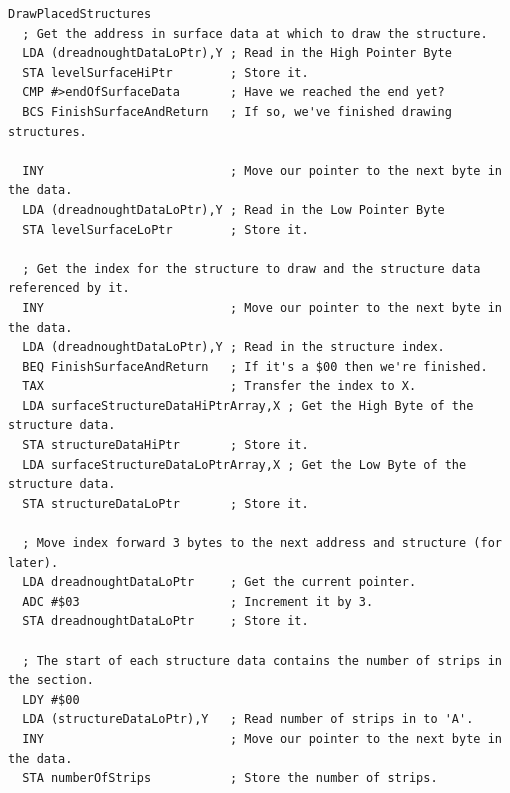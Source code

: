 \clearpage
\begin{lstlisting}[basicstyle=\scriptsize\ttfamily]
DrawPlacedStructures   
  ; Get the address in surface data at which to draw the structure.
  LDA (dreadnoughtDataLoPtr),Y ; Read in the High Pointer Byte
  STA levelSurfaceHiPtr        ; Store it.
  CMP #>endOfSurfaceData       ; Have we reached the end yet?
  BCS FinishSurfaceAndReturn   ; If so, we've finished drawing structures.

  INY                          ; Move our pointer to the next byte in the data.
  LDA (dreadnoughtDataLoPtr),Y ; Read in the Low Pointer Byte
  STA levelSurfaceLoPtr        ; Store it.

  ; Get the index for the structure to draw and the structure data referenced by it.
  INY                          ; Move our pointer to the next byte in the data.
  LDA (dreadnoughtDataLoPtr),Y ; Read in the structure index.
  BEQ FinishSurfaceAndReturn   ; If it's a $00 then we're finished.
  TAX                          ; Transfer the index to X.
  LDA surfaceStructureDataHiPtrArray,X ; Get the High Byte of the structure data.
  STA structureDataHiPtr       ; Store it.
  LDA surfaceStructureDataLoPtrArray,X ; Get the Low Byte of the structure data.
  STA structureDataLoPtr       ; Store it.

  ; Move index forward 3 bytes to the next address and structure (for later).
  LDA dreadnoughtDataLoPtr     ; Get the current pointer.
  ADC #$03                     ; Increment it by 3.
  STA dreadnoughtDataLoPtr     ; Store it.

  ; The start of each structure data contains the number of strips in the section.
  LDY #$00
  LDA (structureDataLoPtr),Y   ; Read number of strips in to 'A'.
  INY                          ; Move our pointer to the next byte in the data.
  STA numberOfStrips           ; Store the number of strips.


\end{lstlisting}
